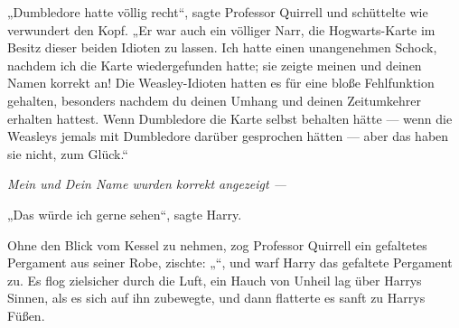„Dumbledore hatte völlig recht“, sagte Professor Quirrell und schüttelte wie verwundert den Kopf.
„Er war auch ein völliger Narr, die Hogwarts-Karte im Besitz dieser beiden Idioten zu lassen. Ich hatte einen unangenehmen Schock, nachdem ich die Karte wiedergefunden hatte; sie zeigte meinen und deinen Namen korrekt an! Die Weasley-Idioten hatten es für eine bloße Fehlfunktion gehalten, besonders nachdem du deinen Umhang und deinen Zeitumkehrer erhalten hattest. Wenn Dumbledore die Karte selbst behalten hätte — wenn die Weasleys jemals mit Dumbledore darüber gesprochen hätten — aber das haben sie nicht, zum Glück.“

\emph{Mein und Dein Name wurden korrekt angezeigt —}

„Das würde ich gerne sehen“, sagte Harry.

Ohne den Blick vom Kessel zu nehmen, zog Professor Quirrell ein gefaltetes Pergament aus seiner Robe, zischte:
„“, und warf Harry das gefaltete Pergament zu.
Es flog zielsicher durch die Luft, ein Hauch von Unheil lag über Harrys Sinnen, als es sich auf ihn zubewegte, und dann flatterte es sanft zu Harrys Füßen.

